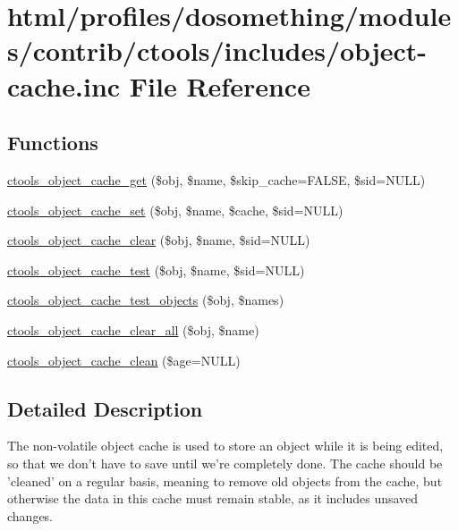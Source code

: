\hypertarget{object-cache_8inc}{
\section{html/profiles/dosomething/modules/contrib/ctools/includes/object-\/cache.inc File Reference}
\label{object-cache_8inc}
}
\subsection*{Functions}
\begin{DoxyCompactItemize}
\item 
\hyperlink{object-cache_8inc_af4ea612c8ee2ee32c9a169553186dece}{ctools\_\-object\_\-cache\_\-get} (\$obj, \$name, \$skip\_\-cache=FALSE, \$sid=NULL)
\item 
\hyperlink{object-cache_8inc_a996b3d25d26d4d3188cf7952d6988e65}{ctools\_\-object\_\-cache\_\-set} (\$obj, \$name, \$cache, \$sid=NULL)
\item 
\hyperlink{object-cache_8inc_a1320649cf3e7337f7c1874f5b9a14cca}{ctools\_\-object\_\-cache\_\-clear} (\$obj, \$name, \$sid=NULL)
\item 
\hyperlink{object-cache_8inc_ade46d09e7031cf1ae127155cdea77668}{ctools\_\-object\_\-cache\_\-test} (\$obj, \$name, \$sid=NULL)
\item 
\hyperlink{object-cache_8inc_a02b391662c8dc1a8f1de75542fbad218}{ctools\_\-object\_\-cache\_\-test\_\-objects} (\$obj, \$names)
\item 
\hyperlink{object-cache_8inc_ab4b1d8faf6c3d55f7dea85f026cc6652}{ctools\_\-object\_\-cache\_\-clear\_\-all} (\$obj, \$name)
\item 
\hyperlink{object-cache_8inc_a56a7767ed65dd1dc91cdfaffc989155d}{ctools\_\-object\_\-cache\_\-clean} (\$age=NULL)
\end{DoxyCompactItemize}


\subsection{Detailed Description}
The non-\/volatile object cache is used to store an object while it is being edited, so that we don't have to save until we're completely done. The cache should be 'cleaned' on a regular basis, meaning to remove old objects from the cache, but otherwise the data in this cache must remain stable, as it includes unsaved changes. 

